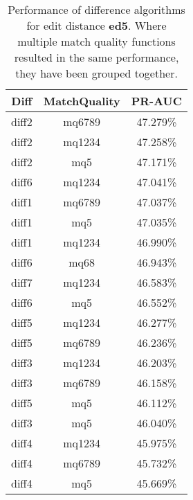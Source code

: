 \begin{table}[tbph]
\begin{center}
\begin{tabular}{|c|c||c|}
\hline
Diff & MatchQuality & PR-AUC  \\
\hline
\hline
diff2 & mq6789 & 47.279\% \\
diff2 & mq1234 & 47.258\% \\
diff2 & mq5 & 47.171\% \\
diff6 & mq1234 & 47.041\% \\
diff1 & mq6789 & 47.037\% \\
diff1 & mq5 & 47.035\% \\
diff1 & mq1234 & 46.990\% \\
diff6 & mq68 & 46.943\% \\
diff7 & mq1234 & 46.583\% \\
diff6 & mq5 & 46.552\% \\
diff5 & mq1234 & 46.277\% \\
diff5 & mq6789 & 46.236\% \\
diff3 & mq1234 & 46.203\% \\
diff3 & mq6789 & 46.158\% \\
diff5 & mq5 & 46.112\% \\
diff3 & mq5 & 46.040\% \\
diff4 & mq1234 & 45.975\% \\
diff4 & mq6789 & 45.732\% \\
diff4 & mq5 & 45.669\% \\
\hline
\end{tabular}
\end{center}
\caption{Performance of difference algorithms for
  edit distance \textbf{ed5}.  Where multiple match
  quality functions resulted in the same performance, they
  have been grouped together.}
\label{tab:editlongbyed5}
\end{table}
